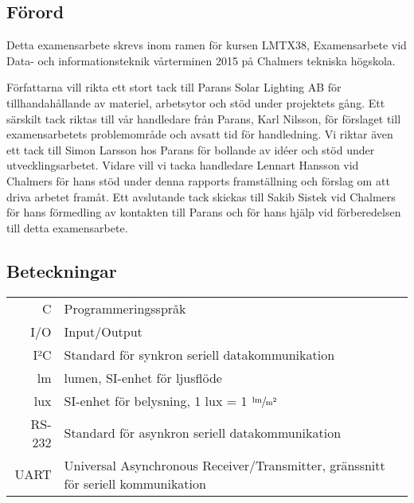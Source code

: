\newpage
\subsection*{Förord} %
\label{sub:f_rord}
    Detta examensarbete skrevs inom ramen för kursen LMTX38, Examensarbete vid Data- och informationsteknik vårterminen 2015 på Chalmers tekniska högskola. \bigskip

    Författarna vill rikta ett stort tack till Parans Solar Lighting AB för tillhandahållande av materiel, arbetsytor och stöd under projektets gång. Ett särskilt tack riktas till vår handledare från Parans, Karl Nilsson, för förslaget till examensarbetets problemområde och avsatt tid för handledning. Vi riktar även ett tack till Simon Larsson hos Parans för bollande av idéer och stöd under utvecklingsarbetet. Vidare vill vi tacka handledare Lennart Hansson vid Chalmers för hans stöd under denna rapports framställning och förslag om att driva arbetet framåt. Ett avslutande tack skickas till Sakib Sistek vid Chalmers för hans förmedling av kontakten till Parans och för hans hjälp vid förberedelsen till detta examensarbete.


\newpage

\subsection*{Beteckningar} %
\label{sub:beteckningar}
    \begin{tabularx}{\textwidth}{@{}rX}
        C & Programmeringsspråk \\
        I/O & Input/Output \\
        I²C & Standard för synkron seriell datakommunikation \\
        lm & lumen, SI-enhet för ljusflöde \\
        lux & SI-enhet för belysning, 1 lux = 1 $\sfrac{\text{lm}}{\text{m}^2}$ \\
        RS-232 & Standard för asynkron seriell datakommunikation \\
        UART & Universal Asynchronous Receiver/Transmitter, gränssnitt för seriell kommunikation
        
    \end{tabularx}
